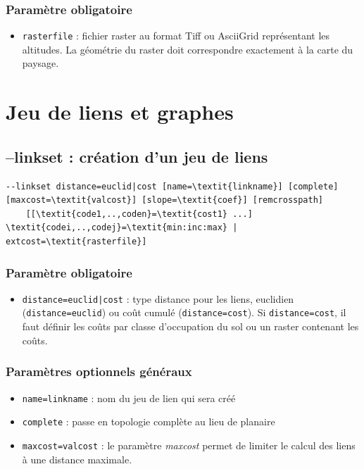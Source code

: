 \documentclass[a4paper,10pt]{report}
\begin{document}
\subsubsection{Paramètre obligatoire}
\begin{itemize}
	\item \verb|rasterfile| : fichier raster au format Tiff ou AsciiGrid représentant les altitudes. La géométrie du raster doit correspondre exactement à la carte du paysage.
\end{itemize}

\section{Jeu de liens et graphes}

\subsection{--linkset : création d'un jeu de liens}
\begin{Verbatim}[commandchars=\\\{\}]
--linkset distance=euclid|cost [name=\textit{linkname}] [complete] [maxcost=\textit{valcost}] [slope=\textit{coef}] [remcrosspath] 
	[[\textit{code1,..,coden}=\textit{cost1} ...] \textit{codei,..,codej}=\textit{min:inc:max} | extcost=\textit{rasterfile}]
\end{Verbatim}

\subsubsection{Paramètre obligatoire}
\begin{itemize}
	\item \verb+distance=euclid|cost+ : type distance pour les liens, euclidien (\verb|distance=euclid|) ou coût cumulé (\verb|distance=cost|). Si \verb|distance=cost|, il faut définir les coûts par classe d'occupation du sol ou un raster contenant les coûts.
\end{itemize}

\subsubsection{Paramètres optionnels généraux}
\begin{itemize}
	\item \verb|name=linkname| : nom du jeu de lien qui sera créé
	\item \verb|complete| : passe en topologie complète au lieu de planaire 
	\item \verb|maxcost=valcost| : le paramètre \textit{maxcost} permet de limiter le calcul des liens à une distance maximale.
\end{itemize}
\end{document}
